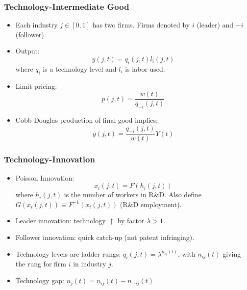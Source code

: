 \documentclass{beamer}
\begin{document}
\begin{frame}[t]\frametitle{Technology-Intermediate Good} 
  \begin{itemize}
    \item<+-> Each industry $j \in [0, 1]$ has two firms. Firms denoted by $i$ (leader) and $-i$ (follower).

    \item<+-> Output:
      \begin{equation*} \label{eq:intermediate_production}
        y(j, t) = q_i(j, t)l_i(j, t)
      \end{equation*}
      where $q_i$ is a technology level and $l_i$ is labor used. 

    \item<+-> Limit pricing:
      \begin{equation*} \label{eq:limit_pricing}
        p(j, t) = \frac{w(t)}{q_{-i}(j, t)}      
      \end{equation*}

    \item<+-> Cobb-Douglas production of final good implies:
      \begin{equation*}
        y(j, t) = \frac{q_{-i}(j, t)}{w(t)}Y(t)
      \end{equation*}
  \end{itemize}
\end{frame}

\begin{frame}[t]\frametitle{Technology-Innovation} 
  \begin{itemize}
    \item<+-> Poisson Innovation:
      \begin{equation*} \label{eq:tech_rd_technology}
        x_i(j, t) = F(h_i(j, t))
      \end{equation*}
      where $h_i(j, t)$ is the number of workers in R\&D.
      Also define $G(x_i(j,t)) \equiv F^{-1}(x_i(j,t))$ (R\&D employment).
    \item<+-> Leader innovation: technology $\uparrow$ by factor $\lambda > 1$.
    \item<+-> Follower innovation: quick catch-up (not patent infringing).
    \item<+-> Technology levels are ladder rungs: $q_i(j, t) = \lambda^{n_{ij}(t)}$, with $n_{ij}(t)$ giving the rung for firm $i$ in industry $j$.
    \item<+-> Technology gap: $n_j(t) = n_{ij}(t) - n_{-ij}(t)$
  \end{itemize}
\end{frame}
\end{document}
